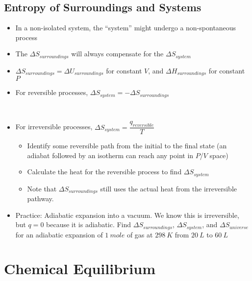 \documentclass[12pt, openany, letterpaper]{memoir}
\begin{document}
\section*{Entropy of Surroundings and Systems}
\begin{itemize}
	\item In a non-isolated system, the ``system'' might undergo a non-spontaneous process
	\item The $\Delta S_{surroundings}$ will always compensate for the $\Delta S_{system}$
	\item $\Delta S_{surroundings} = \Delta U_{surroundings}$ for constant $V$, and $\Delta H_{surroundings}$ for constant $P$
	\item For reversible processes, $\Delta S_{system} = - \Delta S_{surroundings}$
	
	~\newpage
	
	\item For irreversible processes, $\Delta S_{system} = \dfrac{q_{reversible}}{T}$
	\begin{itemize}
		\item Identify some reversible path from the initial to the final state (an adiabat followed by an isotherm can reach any point in $P$/$V$ space)
		\item Calculate the heat for the reversible process to find $\Delta S_{system}$
		\item Note that $\Delta S_{surroundings}$ still uses the actual heat from the irreversible pathway.
	\end{itemize}
	\item Practice: Adiabatic expansion into a vacuum. We know this is irreversible, but $q=0$ because it is adiabatic. Find $\Delta S_{surroundings}$, $\Delta S_{system}$, and $\Delta S_{universe}$ for an adiabatic expansion of $1~mole$ of gas at $298~K$ from $20~L$ to $60~L$
\end{itemize}
\chapter{Chemical Equilibrium}
\end{document}
